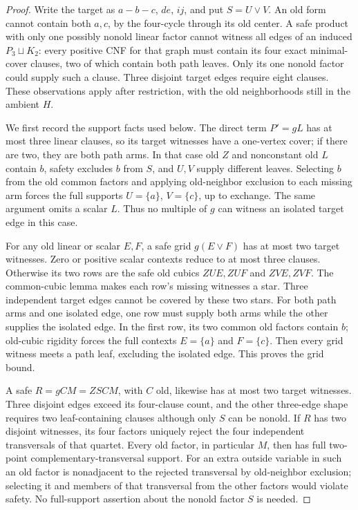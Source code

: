 \documentclass[11pt]{article}
\theoremstyle{definition}
\theoremstyle{remark}
\begin{document}
\begin{proof}
Write the target as $a-b-c$, $de$, $ij$, and put $S=U\vee V$. An old form cannot contain both $a,c$, by the four-cycle through its old center. A safe product with only one possibly nonold linear factor cannot witness all edges of an induced $P_3\sqcup K_2$: every positive CNF for that graph must contain its four exact minimal-cover clauses, two of which contain both path leaves. Only its one nonold factor could supply such a clause. Three disjoint target edges require eight clauses. These observations apply after restriction, with the old neighborhoods still in the ambient $H$.

We first record the support facts used below. The direct term $P'=gL$ has at most three linear clauses, so its target witnesses have a one-vertex cover; if there are two, they are both path arms. In that case old $Z$ and nonconstant old $L$ contain $b$, safety excludes $b$ from $S$, and $U,V$ supply different leaves. Selecting $b$ from the old common factors and applying old-neighbor exclusion to each missing arm forces the full supports $U=\{a\}$, $V=\{c\}$, up to exchange. The same argument omits a scalar $L$. Thus no multiple of $g$ can witness an isolated target edge in this case.

For any old linear or scalar $E,F$, a safe grid $g(E\vee F)$ has at most two target witnesses. Zero or positive scalar contexts reduce to at most three clauses. Otherwise its two rows are the safe old cubics $ZUE,ZUF$ and $ZVE,ZVF$. The common-cubic lemma makes each row's missing witnesses a star. Three independent target edges cannot be covered by these two stars. For both path arms and one isolated edge, one row must supply both arms while the other supplies the isolated edge. In the first row, its two common old factors contain $b$; old-cubic rigidity forces the full contexts $E=\{a\}$ and $F=\{c\}$. Then every grid witness meets a path leaf, excluding the isolated edge. This proves the grid bound.

A safe $R=gCM=ZSCM$, with $C$ old, likewise has at most two target witnesses. Three disjoint edges exceed its four-clause count, and the other three-edge shape requires two leaf-containing clauses although only $S$ can be nonold. If $R$ has two disjoint witnesses, its four factors uniquely reject the four independent transversals of that quartet. Every old factor, in particular $M$, then has full two-point complementary-transversal support. For an extra outside variable in such an old factor is nonadjacent to the rejected transversal by old-neighbor exclusion; selecting it and members of that transversal from the other factors would violate safety. No full-support assertion about the nonold factor $S$ is needed.


\end{proof}
\end{document}
